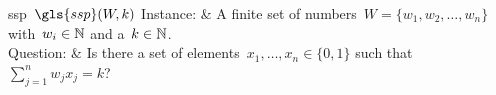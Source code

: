 \begin{problem}[framed]{\acrlong{ssp}~$\gls{ssp}(W,k)$}
    Instance: & A finite set of numbers~$W=\{w_1,w_2,\dots,w_n\}$
    with~$w_i\in\mathbb{N}$ and a~$k\in\mathbb{N}$.\\ %
    Question: & Is there a set of elements~$x_1,\dots,x_n\in\{0,1\}$ such that 
    $\sum_{j=1}^{n}w_jx_j = k$?
\end{problem}